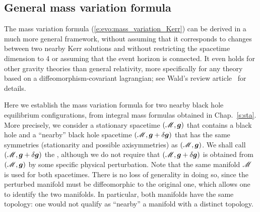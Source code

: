 \subsection{General mass variation formula} \label{s:evo:gen_mass_variation}

The mass variation formula (\ref{e:evo:mass_variation_Kerr}) can be derived in
a much more general framework, without assuming that it corresponds to changes between
two nearby Kerr solutions and without restricting
the spacetime dimension to 4 or assuming that the event horizon is connected.
It even holds for other gravity theories than general relativity, more specifically
for any theory based on a diffeomorphism-covariant lagrangian; see Wald's review
article~\cite{Wald01} for details.

Here we establish the mass variation formula for two nearby black hole
equilibrium configurations, from integral mass formulas obtained in Chap.~\ref{s:sta}.
More precisely, we consider a stationary spacetime $(\mathscr{M},\bm{g})$ that contains
a black hole and a ``nearby'' black hole spacetime $(\mathscr{M},\bm{g}+\delta\bm{g})$ that has the
same symmetries (stationarity and possible axisymmetries) as $(\mathscr{M},\bm{g})$.
We shall call $(\mathscr{M},\bm{g}+\delta\bm{g})$ the ,
although we do not require that $(\mathscr{M},\bm{g}+\delta\bm{g})$ is obtained from
$(\mathscr{M},\bm{g})$ by some specific physical perturbation.
Note that the same manifold $\mathscr{M}$ is used for both spacetimes.
There is no loss of generality in doing so, since the perturbed manifold
must be diffeomorphic to the original one, which allows one to
identify the two manifolds. In particular, both manifolds have the same
topology: one would not qualify as ``nearby'' a manifold with a distinct topology.


